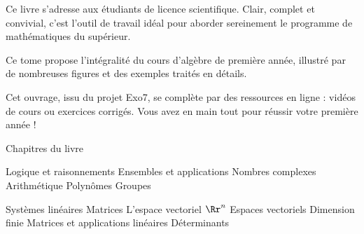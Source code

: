 
Ce livre s'adresse aux étudiants de licence scientifique. 
Clair, complet et convivial, c'est l'outil de travail idéal 
pour aborder sereinement le programme de mathématiques du supérieur. 

Ce tome propose l'intégralité du cours d'algèbre de première année, 
illustré par de nombreuses figures et des exemples traités en détails.  
 
Cet ouvrage, issu du projet Exo7, se complète par des ressources en ligne : 
vidéos de cours ou exercices corrigés. Vous avez en main tout 
pour réussir votre première année !



Chapitres du livre 

Logique et raisonnements
Ensembles et applications
Nombres complexes
Arithmétique
Polynômes
Groupes

Systèmes linéaires
Matrices
L'espace vectoriel $\Rr^n$
Espaces vectoriels
Dimension finie
Matrices et applications linéaires
Déterminants

